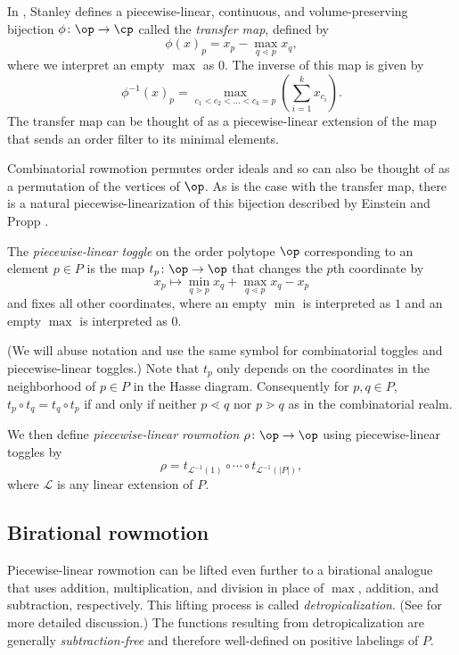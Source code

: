 In \cite{stanley2}, Stanley defines a piecewise-linear, continuous, and volume-preserving bijection $\phi \colon \op \to \cp$ called the \emph{transfer map}, defined by
\[\phi(x)_p = x_p - \max\limits_{q \lessdot p} x_q,\]
where we interpret an empty $\max$ as $0$.
The inverse of this map is given by
\[\phi^{-1}(x)_p = \max\limits_{c_1 < c_2 < \dots < c_k = p} \left( \sum\limits_{i=1}^k x_{c_i} \right).\]
The transfer map can be thought of as a piecewise-linear extension of the map that sends an order filter to its minimal elements.

Combinatorial rowmotion permutes order ideals and so can also be thought of as a permutation of the vertices of $\op$. As is the case with the transfer map, there is a natural piecewise-linearization of this bijection described by Einstein and Propp \cite{einsteinpropp1}.

\begin{Def}
The \textit{piecewise-linear toggle} on the order polytope $\op$ corresponding to an element $p \in P$ is the map $t_p\colon \op \to \op$ that changes the $p$th coordinate by
\[x_p \mapsto \min\limits_{q \gtrdot p} x_q + \max\limits_{q \lessdot p} x_q - x_p\]
and fixes all other coordinates, where an empty $\min$ is interpreted as $1$ and an empty $\max$ is interpreted as $0$.
\end{Def}
(We will abuse notation and use the same symbol for combinatorial toggles and piecewise-linear toggles.)
Note that $t_p$ only depends on the coordinates in the neighborhood of $p \in P$ in the Hasse diagram. Consequently for $p,q \in P$, $t_p \circ t_q = t_q \circ t_p$ if and only if neither $p \lessdot q$ nor $p \gtrdot q$ as in the combinatorial realm.

We then define \textit{piecewise-linear rowmotion} $\rho\colon \op \to \op$ using piecewise-linear toggles by
\[\rho = t_{\mathcal{L}^{-1}(1)} \circ \cdots \circ t_{\mathcal{L}^{-1}(|P|)},\]
where $\mathcal{L}$ is any linear extension of $P$.

\subsection{Birational rowmotion}

Piecewise-linear rowmotion can be lifted even further to a birational analogue that uses addition, multiplication, and division in place of $\max$, addition, and subtraction, respectively. This lifting process is called \emph{detropicalization}. (See \cite{einsteinpropp2,einsteinpropp1,noumiyamada} for more detailed discussion.) The functions resulting from detropicalization are generally \emph{subtraction-free} and therefore well-defined on positive labelings of $P$.

